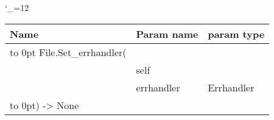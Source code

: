 \begingroup \catcode`\_=12 \tt
\begin{tabular}{lll}
\toprule
\textrm{Name}&\textrm{Param name}&\textrm{param type}\\
\midrule
\hbox to 0pt {File.Set_errhandler(\hss}\\
& self\\
& errhandler & Errhandler\\
\hbox to 0pt{) -> None\hss}\\
\bottomrule
\end{tabular}
\endgroup
